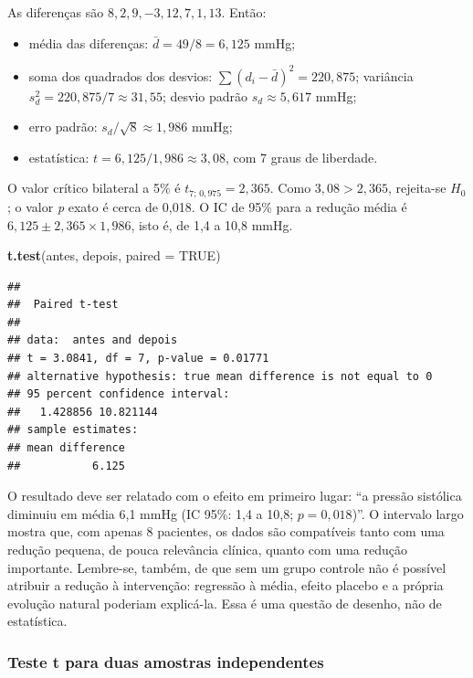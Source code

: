 \documentclass[
]{book}
\newenvironment{Shaded}{\begin{snugshade}}{\end{snugshade}}
\newcommand{\AttributeTok}[1]{\textcolor[rgb]{0.13,0.29,0.53}{#1}}
\newcommand{\ConstantTok}[1]{\textcolor[rgb]{0.56,0.35,0.01}{#1}}
\newcommand{\FunctionTok}[1]{\textcolor[rgb]{0.13,0.29,0.53}{\textbf{#1}}}
\newcommand{\NormalTok}[1]{#1}
\providecommand{\tightlist}{%
  \setlength{\itemsep}{0pt}\setlength{\parskip}{0pt}}
\begin{document}
As diferenças são \(8, 2, 9, -3, 12, 7, 1, 13\). Então:

\begin{itemize}
\tightlist
\item
  média das diferenças: \(\bar{d} = 49/8 = 6{,}125\) mmHg;
\item
  soma dos quadrados dos desvios: \(\sum (d_i - \bar{d})^2 = 220{,}875\); variância \(s_d^2 = 220{,}875/7 \approx 31{,}55\); desvio padrão \(s_d \approx 5{,}617\) mmHg;
\item
  erro padrão: \(s_d/\sqrt{8} \approx 1{,}986\) mmHg;
\item
  estatística: \(t = 6{,}125/1{,}986 \approx 3{,}08\), com 7 graus de liberdade.
\end{itemize}

O valor crítico bilateral a 5\% é \(t_{7;\,0{,}975} = 2{,}365\). Como \(3{,}08 > 2{,}365\), rejeita-se \(H_0\); o valor \emph{p} exato é cerca de 0,018. O IC de 95\% para a redução média é \(6{,}125 \pm 2{,}365 \times 1{,}986\), isto é, de 1,4 a 10,8 mmHg.

\begin{Shaded}
\begin{Highlighting}[]
\FunctionTok{t.test}\NormalTok{(antes, depois, }\AttributeTok{paired =} \ConstantTok{TRUE}\NormalTok{)}
\end{Highlighting}
\end{Shaded}

\begin{verbatim}
## 
##  Paired t-test
## 
## data:  antes and depois
## t = 3.0841, df = 7, p-value = 0.01771
## alternative hypothesis: true mean difference is not equal to 0
## 95 percent confidence interval:
##   1.428856 10.821144
## sample estimates:
## mean difference 
##           6.125
\end{verbatim}

O resultado deve ser relatado com o efeito em primeiro lugar: ``a pressão sistólica diminuiu em média 6,1 mmHg (IC 95\%: 1,4 a 10,8; \(p = 0{,}018\))''. O intervalo largo mostra que, com apenas 8 pacientes, os dados são compatíveis tanto com uma redução pequena, de pouca relevância clínica, quanto com uma redução importante. Lembre-se, também, de que sem um grupo controle não é possível atribuir a redução à intervenção: regressão à média, efeito placebo e a própria evolução natural poderiam explicá-la. Essa é uma questão de desenho, não de estatística.

\subsubsection{Teste t para duas amostras independentes}\label{teste-t-para-duas-amostras-independentes}
\end{document}
